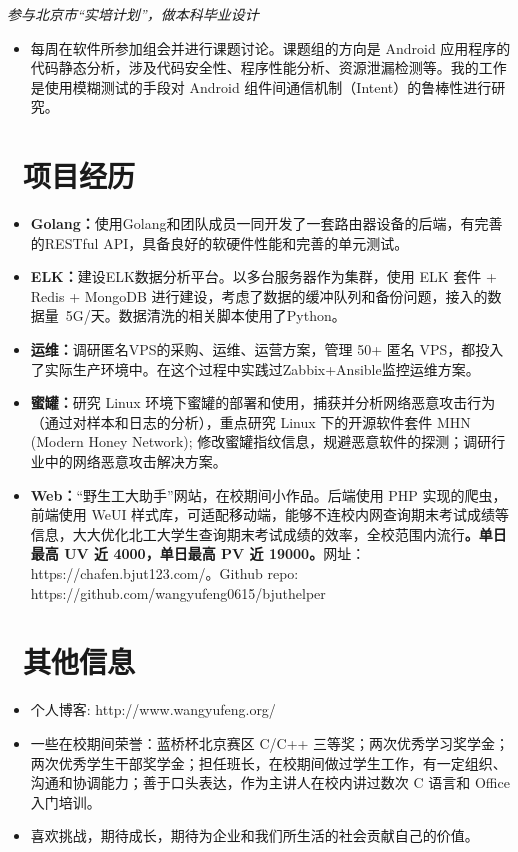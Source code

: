 \documentclass{resume}
\begin{document}
\textit{参与北京市“实培计划”，做本科毕业设计}
\begin{itemize}
  \item 每周在软件所参加组会并进行课题讨论。课题组的方向是 Android 应用程序的代码静态分析，涉及代码安全性、程序性能分析、资源泄漏检测等。我的工作是使用模糊测试的手段对 Android 组件间通信机制（Intent）的鲁棒性进行研究。
\end{itemize}

\section{\faCheckSquareO\ 项目经历}
\begin{itemize}[parsep=0.5ex]
  \item \textbf{Golang：}使用Golang和团队成员一同开发了一套路由器设备的后端，有完善的RESTful API，具备良好的软硬件性能和完善的单元测试。
  \item \textbf{ELK：}建设ELK数据分析平台。以多台服务器作为集群，使用 ELK 套件 + Redis + MongoDB 进行建设，考虑了数据的缓冲队列和备份问题，接入的数据量~5G/天。数据清洗的相关脚本使用了Python。
  \item \textbf{运维：}调研匿名VPS的采购、运维、运营方案，管理 50+ 匿名 VPS，都投入了实际生产环境中。在这个过程中实践过Zabbix+Ansible监控运维方案。
  \item \textbf{蜜罐：}研究 Linux 环境下蜜罐的部署和使用，捕获并分析网络恶意攻击行为（通过对样本和日志的分析），重点研究 Linux 下的开源软件套件 MHN (Modern Honey Network); 修改蜜罐指纹信息，规避恶意软件的探测；调研行业中的网络恶意攻击解决方案。
  \item \textbf{Web：}“野生工大助手”网站，在校期间小作品。后端使用 PHP 实现的爬虫，前端使用 WeUI 样式库，可适配移动端，能够不连校内网查询期末考试成绩等信息，大大优化北工大学生查询期末考试成绩的效率，全校范围内流行\textbf{。单日最高 UV 近 4000，单日最高 PV 近 19000。}网址：https://chafen.bjut123.com/。Github repo: https://github.com/wangyufeng0615/bjuthelper
\end{itemize}

\section{\faInfo\ 其他信息}
\begin{itemize}[parsep=0.5ex]
  \item 个人博客: http://www.wangyufeng.org/
  \item 一些在校期间荣誉：蓝桥杯北京赛区 C/C++ 三等奖；两次优秀学习奖学金；两次优秀学生干部奖学金；担任班长，在校期间做过学生工作，有一定组织、沟通和协调能力；善于口头表达，作为主讲人在校内讲过数次 C 语言和 Office 入门培训。
  \item 喜欢挑战，期待成长，期待为企业和我们所生活的社会贡献自己的价值。


\end{itemize}

%
%
\end{document}
